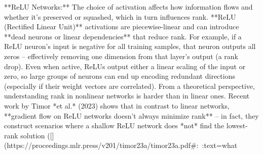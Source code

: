**ReLU Networks:** The choice of activation affects how information flows and whether it’s preserved or squashed, which in turn influences rank. **ReLU (Rectified Linear Unit)** activations are piecewise-linear and can introduce **dead neurons or linear dependencies** that reduce rank. For example, if a ReLU neuron’s input is negative for all training samples, that neuron outputs all zeros – effectively removing one dimension from that layer’s output (a rank drop). Even when active, ReLUs output either a linear scaling of the input or zero, so large groups of neurons can end up encoding redundant directions (especially if their weight vectors are correlated). From a theoretical perspective, understanding rank in nonlinear networks is harder than in linear ones. Recent work by Timor *et al.* (2023) shows that in contrast to linear networks, **gradient flow on ReLU networks doesn’t always minimize rank** – in fact, they construct scenarios where a shallow ReLU network does *not* find the lowest-rank solution ([](https://proceedings.mlr.press/v201/timor23a/timor23a.pdf#:~:text=what%


